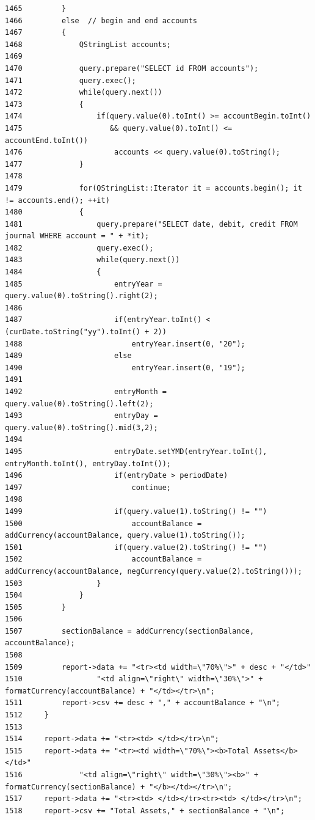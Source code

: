 \begin{verbatim}
1465         }
1466         else  // begin and end accounts
1467         {
1468             QStringList accounts;
1469 
1470             query.prepare("SELECT id FROM accounts");
1471             query.exec();
1472             while(query.next())
1473             {
1474                 if(query.value(0).toInt() >= accountBegin.toInt()
1475                    && query.value(0).toInt() <= accountEnd.toInt())
1476                     accounts << query.value(0).toString();
1477             }
1478 
1479             for(QStringList::Iterator it = accounts.begin(); it != accounts.end(); ++it)
1480             {
1481                 query.prepare("SELECT date, debit, credit FROM journal WHERE account = " + *it);
1482                 query.exec();
1483                 while(query.next())
1484                 {
1485                     entryYear = query.value(0).toString().right(2);
1486                 
1487                     if(entryYear.toInt() < (curDate.toString("yy").toInt() + 2))
1488                         entryYear.insert(0, "20");
1489                     else
1490                         entryYear.insert(0, "19");
1491                 
1492                     entryMonth = query.value(0).toString().left(2);
1493                     entryDay = query.value(0).toString().mid(3,2);
1494                 
1495                     entryDate.setYMD(entryYear.toInt(), entryMonth.toInt(), entryDay.toInt());
1496                     if(entryDate > periodDate)
1497                         continue;
1498 
1499                     if(query.value(1).toString() != "")
1500                         accountBalance = addCurrency(accountBalance, query.value(1).toString());
1501                     if(query.value(2).toString() != "")
1502                         accountBalance = addCurrency(accountBalance, negCurrency(query.value(2).toString()));
1503                 }
1504             }
1505         }
1506 
1507         sectionBalance = addCurrency(sectionBalance, accountBalance);
1508 
1509         report->data += "<tr><td width=\"70%\">" + desc + "</td>"
1510                 "<td align=\"right\" width=\"30%\">" + formatCurrency(accountBalance) + "</td></tr>\n";
1511         report->csv += desc + "," + accountBalance + "\n";
1512     }
1513 
1514     report->data += "<tr><td> </td></tr>\n";
1515     report->data += "<tr><td width=\"70%\"><b>Total Assets</b></td>"
1516             "<td align=\"right\" width=\"30%\"><b>" + formatCurrency(sectionBalance) + "</b></td></tr>\n";
1517     report->data += "<tr><td> </td></tr><tr><td> </td></tr>\n";
1518     report->csv += "Total Assets," + sectionBalance + "\n";

\end{verbatim}

